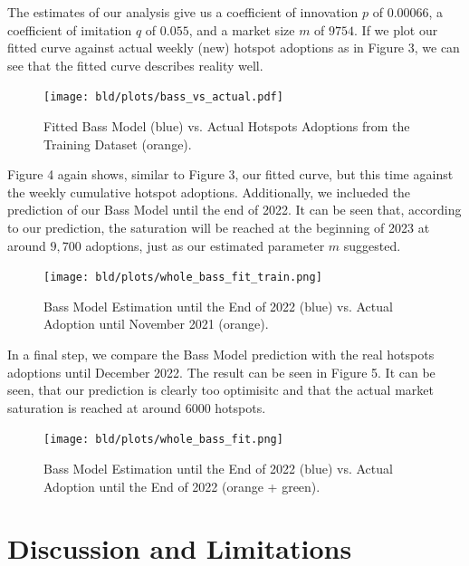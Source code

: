 \documentclass{article}
\begin{document}
\bigskip

\noindent The estimates of our analysis give us a coefficient of innovation $p$ of $0.00066$, a coefficient of imitation $q$ of $0.055$, and a market size $m$ of $9754$. If we
plot our fitted curve against actual weekly (new) hotspot adoptions as in Figure 3, we can see that the fitted curve describes reality well.

\begin{figure}[!hptb]
    \centering{}\texttt{[image: bld/plots/bass\_vs\_actual.pdf]}\\
    \caption{Fitted Bass Model (blue) vs. Actual Hotspots Adoptions from the Training Dataset (orange).}
\end{figure}

\noindent Figure 4 again shows, similar to Figure 3, our fitted curve, but this time against the weekly cumulative hotspot adoptions. Additionally, we inclueded the prediction
of our Bass Model until the end of 2022. It can be seen that, according to our prediction, the saturation will be reached at the beginning of 2023 at around $9,700$ adoptions,
just as our estimated parameter $m$ suggested.

\bigskip
\bigskip
\bigskip
\bigskip

\begin{figure}[!hptb]
    \centering{}\texttt{[image: bld/plots/whole\_bass\_fit\_train.png]}\\
    \caption{Bass Model Estimation until the End of 2022 (blue) vs. Actual Adoption until November 2021 (orange).}
\end{figure}

\noindent In a final step, we compare the Bass Model prediction with the real hotspots adoptions until December 2022. The result can be seen in Figure 5. It can be seen, that our
prediction is clearly too optimisitc and that the actual market saturation is reached at around $6000$ hotspots.

\begin{figure}[!hptb]
    \centering{}\texttt{[image: bld/plots/whole\_bass\_fit.png]}\\
    \caption{Bass Model Estimation until the End of 2022 (blue) vs. Actual Adoption until the End of 2022 (orange + green).}
\end{figure}


\section{Discussion and Limitations}
\end{document}
